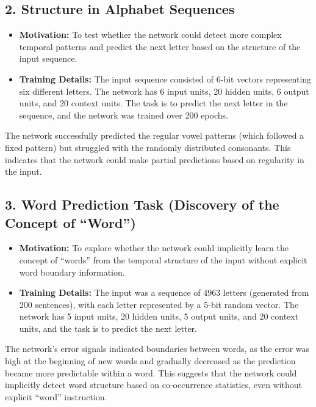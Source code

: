 \documentclass[11p,oneside]{book}
\begin{document}
\subsection*{2. Structure in Alphabet Sequences}

\begin{itemize}
    \item \textbf{Motivation:} To test whether the network could detect more complex temporal patterns and predict the next letter based on the structure of the input sequence.
    \item \textbf{Training Details:} The input sequence consisted of 6-bit vectors representing six different letters. The network has 6 input units, 20 hidden units, 6 output units, and 20 context units. The task is to predict the next letter in the sequence, and the network was trained over 200 epochs.
\end{itemize}

The network successfully predicted the regular vowel patterns (which followed a fixed pattern) but struggled with the randomly distributed consonants. This indicates that the network could make partial predictions based on regularity in the input. \\

\subsection*{3. Word Prediction Task (Discovery of the Concept of “Word”)}

\begin{itemize}
    \item \textbf{Motivation:} To explore whether the network could implicitly learn the concept of “words” from the temporal structure of the input without explicit word boundary information.
    \item \textbf{Training Details:} The input was a sequence of 4963 letters (generated from 200 sentences), with each letter represented by a 5-bit random vector. The network has 5 input units, 20 hidden units, 5 output units, and 20 context units, and the task is to predict the next letter.
\end{itemize}

The network’s error signals indicated boundaries between words, as the error was high at the beginning of new words and gradually decreased as the prediction became more predictable within a word. This suggests that the network could implicitly detect word structure based on co-occurrence statistics, even without explicit “word” instruction. \\
\end{document}
